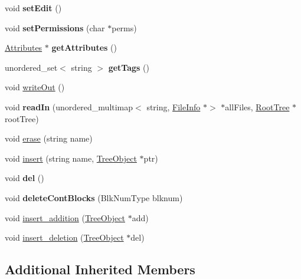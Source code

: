\begin{DoxyCompactItemize}
void {\bfseries set\+Edit} ()
\item 
\mbox{\label{classFileInfo_ab2b69861ecef1b8e0f465906c8eaa7a7}} 
void {\bfseries set\+Permissions} (char $\ast$perms)
\item 
\mbox{\label{classFileInfo_abc9f651fdf3daf17e5526628b9edc272}} 
\mbox{\hyperlink{classAttributes}{Attributes}} $\ast$ {\bfseries get\+Attributes} ()
\item 
\mbox{\label{classFileInfo_a0335ecd3301d3dd709de5e004567fd29}} 
unordered\+\_\+set$<$ string $>$ {\bfseries get\+Tags} ()
\item 
void \mbox{\hyperlink{classFileInfo_a15d8f9279f1d60e4db4618cb81e68414}{write\+Out}} ()
\item 
\mbox{\label{classFileInfo_a0e74605dd535e73027ad1c1c6242db09}} 
void {\bfseries read\+In} (unordered\+\_\+multimap$<$ string, \mbox{\hyperlink{classFileInfo}{File\+Info}} $\ast$$>$ $\ast$all\+Files, \mbox{\hyperlink{classRootTree}{Root\+Tree}} $\ast$root\+Tree)
\item 
void \mbox{\hyperlink{classFileInfo_ae058242283d3317eaf2b79428e6137f6}{erase}} (string name)
\item 
void \mbox{\hyperlink{classFileInfo_ad93a84b63e417b07aa68b619051ab746}{insert}} (string name, \mbox{\hyperlink{classTreeObject}{Tree\+Object}} $\ast$ptr)
\item 
\mbox{\label{classFileInfo_a2ca34d945ed1208f227a249ba72ee427}} 
void {\bfseries del} ()
\item 
\mbox{\label{classFileInfo_a530a418e213a0a945b75ee1dcb8f6acb}} 
void {\bfseries delete\+Cont\+Blocks} (Blk\+Num\+Type blknum)
\item 
void \mbox{\hyperlink{classFileInfo_a7f788f31521c535646eebfa9959bbb24}{insert\+\_\+addition}} (\mbox{\hyperlink{classTreeObject}{Tree\+Object}} $\ast$add)
\item 
void \mbox{\hyperlink{classFileInfo_a278136b1d68f55dc56a4be807076fc0d}{insert\+\_\+deletion}} (\mbox{\hyperlink{classTreeObject}{Tree\+Object}} $\ast$del)
\end{DoxyCompactItemize}
\subsection*{Additional Inherited Members}


